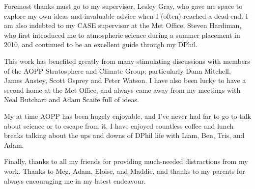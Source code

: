 \begin{acknowledgements}

  Foremost thanks must go to my supervisor, Lesley Gray, who gave me space to
  explore my own ideas and invaluable advice when I (often) reached a
  dead-end. I am also indebted to my CASE supervisor at the Met Office, Steven
  Hardiman, who first introduced me to atmospheric science during a summer
  placement in 2010, and continued to be an excellent guide through my DPhil.

  This work has benefited greatly from many stimulating discussions with members
  of the AOPP Stratosphere and Climate Group; particularly Dann Mitchell, James
  Anstey, Scott Osprey and Peter Watson. I have also been lucky to have a second
  home at the Met Office, and always came away from my meetings with Neal
  Butchart and Adam Scaife full of ideas.

  My at time AOPP has been hugely enjoyable, and I've never had far to go to
  talk about science or to escape from it. I have enjoyed countless coffee and
  lunch breaks talking about the ups and downs of DPhil life with Liam, Ben,
  Tris, and Adam.

  Finally, thanks to all my friends for providing much-needed distractions from
  my work. Thanks to Meg, Adam, Eloise, and Maddie, and thanks to my parents for
  always encouraging me in my latest endeavour.


\end{acknowledgements}




